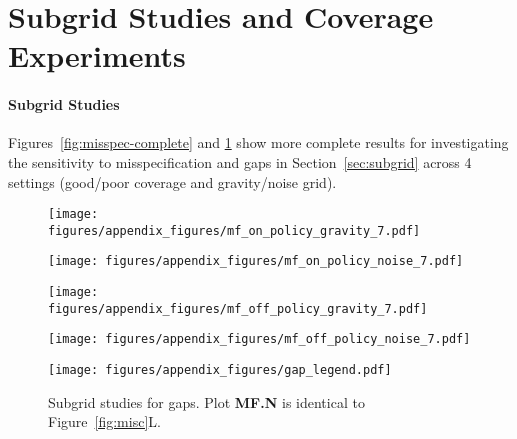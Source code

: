 

\section{Subgrid Studies and Coverage Experiments}  
\paragraph{Subgrid Studies} 
Figures~\ref{fig:misspec-complete} and \ref{fig:gap-complete} show more complete results for investigating the sensitivity to misspecification and gaps in Section~\ref{sec:subgrid} across 4 settings (good/poor coverage and gravity/noise grid). 

\begin{figure}[H]
    \centering
    \begin{minipage}{0.25\textwidth}
        \texttt{[image: figures/appendix\_figures/mf\_on\_policy\_gravity\_7.pdf]}
    \end{minipage}%
    \begin{minipage}{0.25\textwidth}
        \texttt{[image: figures/appendix\_figures/mf\_on\_policy\_noise\_7.pdf]}
    \end{minipage}%
    \begin{minipage}{0.25\textwidth}
        \texttt{[image: figures/appendix\_figures/mf\_off\_policy\_gravity\_7.pdf]}
    \end{minipage}%
    \begin{minipage}{0.25\textwidth}
        \texttt{[image: figures/appendix\_figures/mf\_off\_policy\_noise\_7.pdf]}
    \end{minipage}%
    \begin{minipage}{0.25\textwidth}
    \end{minipage}%
    \vspace{0.01pt}
    \begin{minipage}{\textwidth}
        \texttt{[image: figures/appendix\_figures/gap\_legend.pdf]}
    \end{minipage}%
    \caption{Subgrid studies for gaps. Plot \textbf{MF.N} is identical to Figure~\ref{fig:misc}L.}
    \label{fig:gap-complete}
\end{figure}


